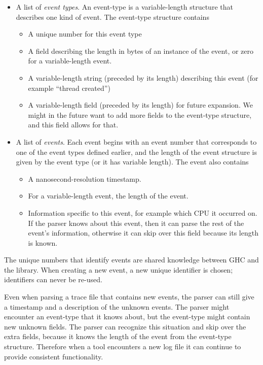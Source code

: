 \begin{itemize}
\item A list of \emph{event types}.  An event-type is a
  variable-length structure that describes one kind of event.  The
  event-type structure contains
  \begin{itemize}
    \item A unique number for this event type
    \item A field describing the length in bytes of an instance of the
      event, or zero for a variable-length event.
    \item A variable-length string (preceded by its length) describing
      this event (for example ``thread created'')
    \item A variable-length field (preceded by its length) for future
      expansion.  We might in the future want to add more fields to
      the event-type structure, and this field allows for that.
  \end{itemize}
\item A list of \emph{events}.  Each event begins with an event number
  that corresponds to one of the event types defined earlier, and the
  length of the event structure is given by the event type (or it has
  variable length).  The event also contains
  \begin{itemize}
  \item A nanosecond-resolution timestamp.
  \item For a variable-length event, the length of the event.
  \item Information specific to this event, for example which CPU it
    occurred on.  If the parser knows about this event, then it can
    parse the rest of the event's information, otherwise it can skip
    over this field because its length is known.
  \end{itemize}
\end{itemize}

The unique numbers that identify events are shared knowledge between
GHC and the  library.  When creating a new event, a new
unique identifier is chosen; identifiers can never be re-used.

Even when parsing a trace file that contains new events, the parser
can still give a timestamp and a description of the unknown events.
The parser might encounter an event-type that it knows about, but the
event-type might contain new unknown fields.  The parser can recognize
this situation and skip over the extra fields, because it knows the
length of the event from the event-type structure.  Therefore when a
tool encounters a new log file it can continue to provide consistent
functionality.

